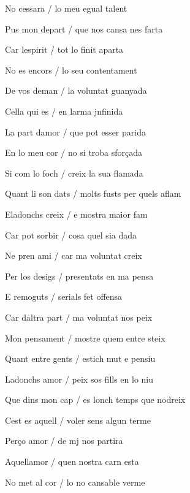 \documentclass[12pt]{article}
\begin{document}
\begin{estrofa}

 No cessara / lo meu egual talent

 Pus mon depart / que nos cansa nes farta

 Car lespirit / tot lo finit aparta

 No es encors / lo seu contentament

 De vos deman / la voluntat guanyada

 Cella qui es / en larma jnfinida

 La part damor / que pot esser parida

 En lo meu cor / no si troba sfor\c{c}ada

\end{estrofa}



\begin{estrofa}

 Si com lo foch / creix la sua flamada

 Quant li son dats / molts fusts per quels aflam

 Eladonchs creix / e mostra maior fam

 Car pot sorbir / cosa quel sia dada

 Ne pren ami / car ma voluntat creix

 Per los desigs / presentats en ma pensa

 E remoguts / serials fet offensa

 Car daltra part / ma voluntat nos peix

\end{estrofa}



\begin{estrofa}

 Mon pensament / mostre quem entre steix

 Quant entre gents / estich mut e pensiu

 Ladonchs amor / peix sos fills en lo niu

 Que dins mon cap / es lonch temps que nodreix

 Cest es aquell / voler sens algun terme

 Per\c{c}o amor / de mj nos partira

 Aquellamor / quen nostra carn esta

 No met al cor / lo no cansable verme

\end{estrofa}
\end{document}
